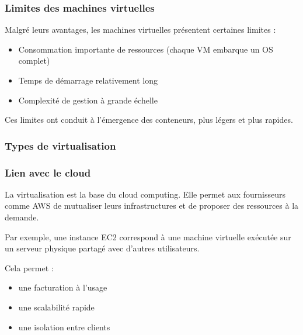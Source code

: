 \documentclass{report} %
\begin{document}
\subsubsection{Limites des machines virtuelles}

Malgré leurs avantages, les machines virtuelles présentent certaines limites :

\begin{itemize}
  \item Consommation importante de ressources (chaque VM embarque un OS complet)
  \item Temps de démarrage relativement long
  \item Complexité de gestion à grande échelle
\end{itemize}

Ces limites ont conduit à l’émergence des conteneurs, plus légers et plus rapides.

\subsubsection{Types de virtualisation}



\subsubsection{Lien avec le cloud}

La virtualisation est la base du cloud computing. Elle permet aux fournisseurs comme AWS de mutualiser leurs infrastructures et de proposer des ressources à la demande.

Par exemple, une instance EC2 correspond à une machine virtuelle exécutée sur un serveur physique partagé avec d’autres utilisateurs.

Cela permet :
\begin{itemize}
\item une facturation à l’usage
\item une scalabilité rapide
\item une isolation entre clients
\end{itemize}
\end{document}
